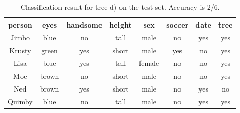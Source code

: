 \begin{table}[h!]
  \centering
  \begin{tabular}{cccccc|c|c}
    \toprule
    person      & eyes  & handsome & height & sex    & soccer & date & tree\\
    \midrule
    Jimbo       & blue  & no       & tall   & male   & no     & yes & yes\\
    Krusty      & green & yes      & short  & male   & yes    & no  & yes\\
    Lisa        & blue  & yes      & tall   & female & no     & no  & yes\\
    Moe         & brown & no       & short  & male   & no     & no  & yes\\
    Ned         & brown & yes      & short  & male   & no     & yes & no \\
    Quimby      & blue  & no       & tall   & male   & no     & yes & yes\\
    \bottomrule
  \end{tabular}
  \caption{Classification result for tree d) on the test set. Accuracy is 2/6.}
  \label{tab:tree-ralph}
\end{table}

